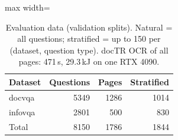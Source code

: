 \begin{table}[t]
\centering
\caption{Evaluation data (validation splits). Natural = all questions; stratified = up to 150 per (dataset, question type). docTR OCR of all pages: 471\,s, 29.3\,kJ on one RTX 4090.}
\label{tab:data}
\begin{adjustbox}{max width=\linewidth}
\begin{tabular}{lrrr}
\toprule
\textbf{Dataset} & \textbf{Questions} & \textbf{Pages} & \textbf{Stratified} \\
\midrule
docvqa & 5349 & 1286 & 1014 \\
infovqa & 2801 & 500 & 830 \\
Total & 8150 & 1786 & 1844 \\
\bottomrule
\end{tabular}
\end{adjustbox}
\end{table}
